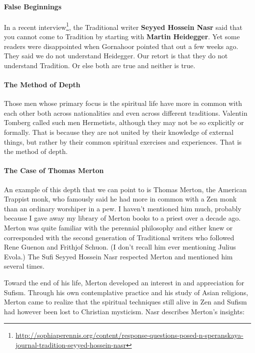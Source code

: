\paragraph{False Beginnings}
In a recent interview\footnote{\url{http://sophiaperennis.org/content/response-questions-posed-n-speranskaya-journal-tradition-seyyed-hossein-nasr}}, the Traditional writer \textbf{Seyyed Hossein Nasr} said that you cannot come to Tradition by starting with \textbf{Martin Heidegger}. Yet some readers were disappointed when Gornahoor pointed that out a few weeks ago. They said we do not understand Heidegger. Our retort is that they do not understand Tradition. Or else both are true and neither is true.

\paragraph{The Method of Depth}
Those men whose primary focus is the spiritual life have more in common with each other both across nationalities and even across different traditions. Valentin Tomberg called such men Hermetists, although they may not be so explicitly or formally. That is because they are not united by their knowledge of external things, but rather by their common spiritual exercises and experiences. That is the method of depth.

\paragraph{The Case of Thomas Merton}
An example of this depth that we can point to is Thomas Merton, the American Trappist monk, who famously said he had more in common with a Zen monk than an ordinary worshiper in a pew. I haven't mentioned him much, probably because I gave away my library of Merton books to a priest over a decade ago. Merton was quite familiar with the perennial philosophy and either knew or corresponded with the second generation of Traditional writers who followed Rene Guenon and Frithjof Schuon. (I don't recall him ever mentioning Julius Evola.) The Sufi Seyyed Hossein Nasr respected Merton and mentioned him several times.

Toward the end of his life, Merton developed an interest in and appreciation for Sufism. Through his own contemplative practice and his study of Asian religions, Merton came to realize that the spiritual techniques still alive in Zen and Sufism had however been lost to Christian mysticism. Nasr describes Merton's insights:

